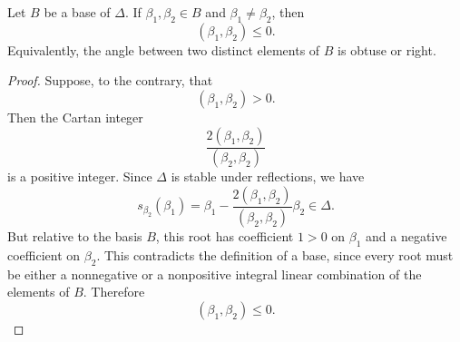 \begin{lemma}
    Let \(B\) be a base of \(\Delta\). If \(\beta_1,\beta_2\in B\) and
    \(\beta_1\neq \beta_2\), then
    \[
        (\beta_1,\beta_2)\leq 0.
    \]
    Equivalently, the angle between two distinct elements of \(B\) is obtuse or
    right.
\end{lemma}

\begin{proof}
    Suppose, to the contrary, that
    \[
        (\beta_1,\beta_2)>0.
    \]
    Then the Cartan integer
    \[
        \frac{2(\beta_1,\beta_2)}{(\beta_2,\beta_2)}
    \]
    is a positive integer. Since \(\Delta\) is stable under reflections, we have
    \[
        s_{\beta_2}(\beta_1)
        =
        \beta_1
        -
        \frac{2(\beta_1,\beta_2)}{(\beta_2,\beta_2)}\beta_2
        \in \Delta.
    \]
    But relative to the basis \(B\), this root has coefficient \(1>0\) on
    \(\beta_1\) and a negative coefficient on \(\beta_2\). This contradicts the
    definition of a base, since every root must be either a nonnegative or a
    nonpositive integral linear combination of the elements of \(B\). Therefore
    \[
        (\beta_1,\beta_2)\leq 0.
    \]
\end{proof}

